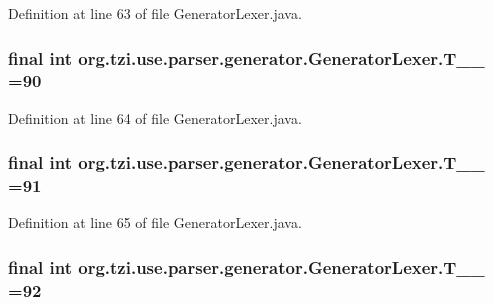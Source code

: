 Definition at line 63 of file Generator\-Lexer.\-java.

\hypertarget{classorg_1_1tzi_1_1use_1_1parser_1_1generator_1_1_generator_lexer_a8e127e74ab3990261cc854e9cb5ae269}{
\subsubsection[{T\-\_\-\-\_\-90}]{\setlength{\rightskip}{0pt plus 5cm}final int org.\-tzi.\-use.\-parser.\-generator.\-Generator\-Lexer.\-T\-\_\-\-\_ =90\hspace{0.3cm}{\ttfamily [static]}}}\label{classorg_1_1tzi_1_1use_1_1parser_1_1generator_1_1_generator_lexer_a8e127e74ab3990261cc854e9cb5ae269}


Definition at line 64 of file Generator\-Lexer.\-java.

\hypertarget{classorg_1_1tzi_1_1use_1_1parser_1_1generator_1_1_generator_lexer_a9a6dfd1aefc59391040d66cc86dc5cf1}{
\subsubsection[{T\-\_\-\-\_\-91}]{\setlength{\rightskip}{0pt plus 5cm}final int org.\-tzi.\-use.\-parser.\-generator.\-Generator\-Lexer.\-T\-\_\-\-\_ =91\hspace{0.3cm}{\ttfamily [static]}}}\label{classorg_1_1tzi_1_1use_1_1parser_1_1generator_1_1_generator_lexer_a9a6dfd1aefc59391040d66cc86dc5cf1}


Definition at line 65 of file Generator\-Lexer.\-java.

\hypertarget{classorg_1_1tzi_1_1use_1_1parser_1_1generator_1_1_generator_lexer_aaaa58c3a75f815a311444dc4d9b00e3b}{
\subsubsection[{T\-\_\-\-\_\-92}]{\setlength{\rightskip}{0pt plus 5cm}final int org.\-tzi.\-use.\-parser.\-generator.\-Generator\-Lexer.\-T\-\_\-\-\_ =92\hspace{0.3cm}{\ttfamily [static]}}}\label{classorg_1_1tzi_1_1use_1_1parser_1_1generator_1_1_generator_lexer_aaaa58c3a75f815a311444dc4d9b00e3b}


